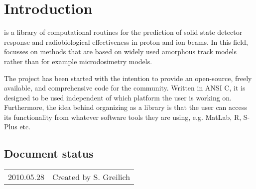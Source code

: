 
\chapter{Introduction}

\la{} is a library of computational routines for the prediction of solid state detector response and radiobiological effectiveness in proton and ion beams. In this field, \la{} focusses on methods that are based on widely used amorphous track models rather than for example microdosimetry models.

The \la{} project has been started with the intention to provide an open-source, freely available, and comprehensive code for the community. Written in ANSI C, it is designed to be used independent of which platform the user is working on. Furthermore, the idea behind organizing \la{} as a library is that the user can access its functionality from whatever software tools they are using, e.g. MatLab, R, S-Plus etc.

\section*{Document status}
\begin{tabular}{l l}
2010.05.28&Created by S. Greilich
\end{tabular}